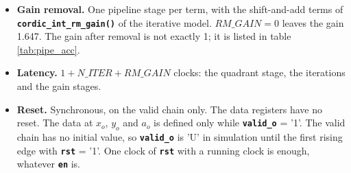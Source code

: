 \documentclass[a4paper, 12pt, notitlepage]{report}
\newcommand{\signal}[1]{{\textbf{\tt#1}}}
\begin{document}
\begin{itemize}
         $(x_i, y_i)$ and ignores $a_i$. $x_o$ is the gain times $\sqrt{x^2+y^2}$, $y_o$ is a
         residual near zero and $a_o$ is $\mathrm{atan2}(y, x)$ as an unsigned binary angle in
         $[0, 2^{A\_WIDTH})$, the format of $a_i$.
         \begin{itemize}
            \item The first stage keeps a vector with $x \ge 0$ and sets the angle to 0. For $x < 0$, $y \ge 0$ it
                  gives $(y, -x)$ with the angle $2^{A\_WIDTH-2}$ (90 degrees); for $x < 0$, $y < 0$ it gives
                  $(-y, x)$ with the angle $3 \cdot 2^{A\_WIDTH-2}$ (270 degrees). The vector is then in the
                  right half-plane, inside the convergence range of $\pm 99.9$ degrees.
            \item Stage $i$ takes its direction from the sign bit of $y$. For $y \ge 0$:
                  $x' = x + (y \gg i)$, $y' = y - (x \gg i)$, $a' = a + \mathrm{atan}_i$; for $y < 0$:
                  $x' = x - (y \gg i)$, $y' = y + (x \gg i)$, $a' = a - \mathrm{atan}_i$. $\mathrm{atan}_i$ is
                  the table entry truncated to $A\_WIDTH$ bits; the angle accumulator has $A\_WIDTH$ bits and wraps
                  modulo $2^{A\_WIDTH}$.
            \item Gain removal acts on $x$ and $y$; the angle is delayed through those stages. Latency,
                  handshake, \signal{en} and reset are those of rotation.
            \item The input $(0, 0)$ gives $x_o = y_o = 0$ and an angle that model and RTL agree on and that
                  carries no meaning.
            \item An unconnected $a_o$ lets synthesis remove the angle registers (table \ref{tab:pipe_synth}).
         \end{itemize}
   \item \textbf{Gain removal.} One pipeline stage per term, with the shift-and-add terms of
         \signal{cordic\_int\_rm\_gain()} of the iterative model. $RM\_GAIN = 0$ leaves the gain 1.647.
         The gain after removal is not exactly 1; it is listed in table \ref{tab:pipe_acc}.
   \item \textbf{Latency.} $1 + N\_ITER + RM\_GAIN$ clocks: the quadrant stage, the iterations
         and the gain stages.
   \item \textbf{Reset.} Synchronous, on the valid chain only. The data registers have no reset.
         The data at $x_o$, $y_o$ and $a_o$ is defined only while \signal{valid\_o} = '1'. The valid chain has
         no initial value, so \signal{valid\_o} is 'U' in simulation until the first rising edge with
         \signal{rst} = '1'. One clock of \signal{rst} with a running clock is enough, whatever \signal{en} is.
\end{itemize}
\end{document}
